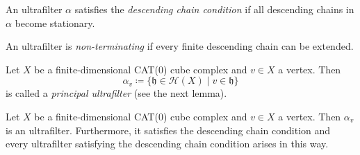 


\begin{defin}
  An ultrafilter \(\alpha\) satisfies the \emph{descending chain condition} if all descending chains in \(\alpha\) become stationary.

  An ultrafilter is \emph{non-terminating} if every finite descending chain can be extended.

  Let \(X\) be a finite-dimensional CAT(0) cube complex and \(v \in X\) a vertex. Then
  \[
    \alpha_v \coloneqq \{\mathfrak{h} \in \mathcal{H}(X) \mid v \in \mathfrak{h}\}
  \]
  is called a \emph{principal ultrafilter} (see the next lemma).
\end{defin}

\begin{lemma}
  \label{lem:principle-uf}
  Let \(X\) be a finite-dimensional CAT(0) cube complex and \(v \in X\) a vertex. Then \(\alpha_v\) is an ultrafilter. Furthermore, it satisfies the descending chain condition and every ultrafilter satisfying the descending chain condition arises in this way.
\end{lemma}

